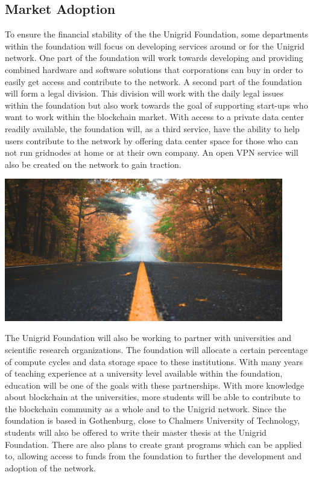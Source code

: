 \documentclass{article}
\begin{document}
\subsection{Market Adoption}
To ensure the financial stability of the the Unigrid Foundation, some departments within the foundation will focus on developing services around or for the Unigrid network. One part of the foundation will work towards developing and providing combined hardware and software solutions that corporations can buy in order to easily get access and contribute to the network. A second part of the foundation will form a legal division. This division will work with the daily legal issues within the foundation but also work towards the goal of supporting start-ups who want to work within the blockchain market. With access to a private data center readily available, the foundation will, as a third service, have the ability to help users contribute to the network by offering data center space for those who can not run gridnodes at home or at their own company. An open VPN service will also be created on the network to gain traction. 

\begin{mdframed}[style=textimage]
	\includegraphics[width=345pt]{road}
\end{mdframed}

\noindent The Unigrid Foundation will also be working to partner with universities and scientific research organizations. The foundation will allocate a certain percentage of compute cycles and data storage space to these institutions. With many years of teaching experience at a university level available within the foundation, education will be one of the goals with these partnerships. With more knowledge about blockchain at the universities, more students will be able to contribute to the blockchain community as a whole and to the Unigrid network. Since the foundation is based in Gothenburg, close to Chalmers University of Technology, students will also be offered to write their master thesis at the Unigrid Foundation. There are also plans to create grant programs which can be applied to, allowing access to funds from the foundation to further the development and adoption of the network. 
\end{document}
